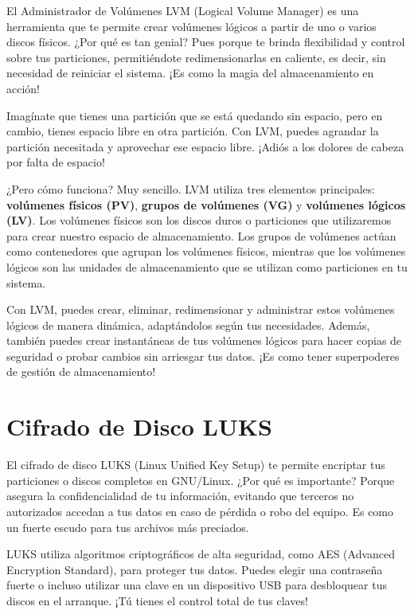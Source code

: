 \documentclass[
  a4paper,
]{article}
\begin{document}
El Administrador de Volúmenes LVM (Logical Volume Manager) es una
herramienta que te permite crear volúmenes lógicos a partir de uno o
varios discos físicos. ¿Por qué es tan genial? Pues porque te brinda
flexibilidad y control sobre tus particiones, permitiéndote
redimensionarlas en caliente, es decir, sin necesidad de reiniciar el
sistema. ¡Es como la magia del almacenamiento en acción!

Imagínate que tienes una partición que se está quedando sin espacio,
pero en cambio, tienes espacio libre en otra partición. Con LVM, puedes
agrandar la partición necesitada y aprovechar ese espacio libre. ¡Adiós
a los dolores de cabeza por falta de espacio!

¿Pero cómo funciona? Muy sencillo. LVM utiliza tres elementos
principales: \textbf{volúmenes físicos (PV)}, \textbf{grupos de
volúmenes (VG)} y \textbf{volúmenes lógicos (LV)}. Los volúmenes físicos
son los discos duros o particiones que utilizaremos para crear nuestro
espacio de almacenamiento. Los grupos de volúmenes actúan como
contenedores que agrupan los volúmenes físicos, mientras que los
volúmenes lógicos son las unidades de almacenamiento que se utilizan
como particiones en tu sistema.

Con LVM, puedes crear, eliminar, redimensionar y administrar estos
volúmenes lógicos de manera dinámica, adaptándolos según tus
necesidades. Además, también puedes crear instantáneas de tus volúmenes
lógicos para hacer copias de seguridad o probar cambios sin arriesgar
tus datos. ¡Es como tener superpoderes de gestión de almacenamiento!

\hypertarget{cifrado-de-disco-luks}{%
\section{Cifrado de Disco LUKS}\label{cifrado-de-disco-luks}}

El cifrado de disco LUKS (Linux Unified Key Setup) te permite encriptar
tus particiones o discos completos en GNU/Linux. ¿Por qué es importante?
Porque asegura la confidencialidad de tu información, evitando que
terceros no autorizados accedan a tus datos en caso de pérdida o robo
del equipo. Es como un fuerte escudo para tus archivos más preciados.

LUKS utiliza algoritmos criptográficos de alta seguridad, como AES
(Advanced Encryption Standard), para proteger tus datos. Puedes elegir
una contraseña fuerte o incluso utilizar una clave en un dispositivo USB
para desbloquear tus discos en el arranque. ¡Tú tienes el control total
de tus claves!
\end{document}
